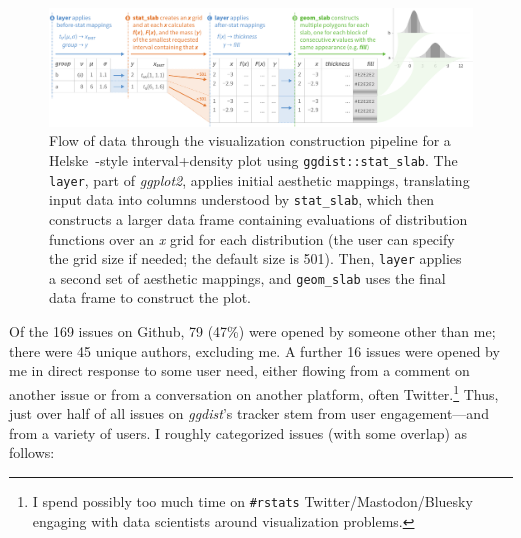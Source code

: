 \documentclass[journal]{vgtc}                     %
\begin{document}
\begin{figure}[t!]
\vspace*{-10pt}
\includegraphics[width=\textwidth]{figs/4-slab_pipeline.pdf}
\vspace*{-17pt}
\caption{Flow of data through the visualization construction pipeline for a Helske~\cite{helske2021can}-style interval+density plot using \texttt{ggdist::stat\_slab}. The \texttt{layer}, part of \textit{ggplot2}, applies initial aesthetic mappings, translating input data into columns understood by \texttt{stat\_slab}, which then constructs a larger data frame containing evaluations of distribution functions over an \textit{x} grid for each distribution (the user can specify the grid size if needed; the default size is 501). Then, \texttt{layer} applies a second set of aesthetic mappings, and \texttt{geom\_slab} uses the final data frame to construct the plot.}
\vspace*{-13pt}
\label{fig:implementation}
\end{figure}


Of the 169 issues on Github, 79 (47\%) were opened by someone other than me; there were 45 unique authors, excluding me. A further 16 issues were opened by me in direct response to some user need, either flowing from a comment on another issue or from a conversation on another platform, often Twitter.\footnote{I spend possibly too much time on \texttt{\#rstats} Twitter/Mastodon/Bluesky engaging with data scientists around visualization problems.} Thus, just over half of all issues on \textit{ggdist}'s tracker stem from user engagement---and from a variety of users. I roughly categorized issues (with some overlap) as follows:
\end{document}

